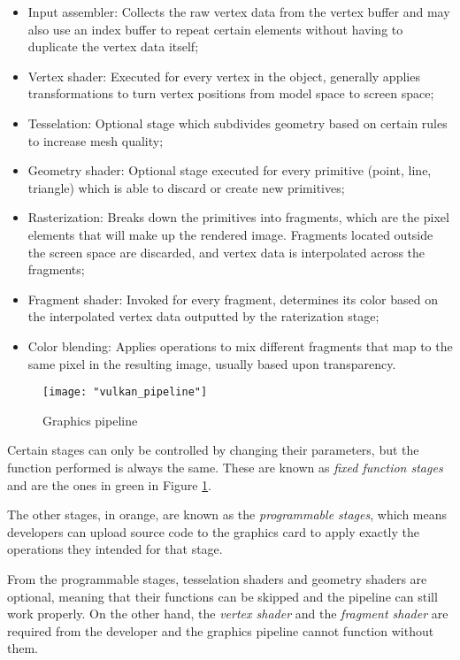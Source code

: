 \begin{itemize}
    \item Input assembler: Collects the raw vertex data from the vertex buffer and may also use an index buffer to repeat certain elements without having to duplicate the vertex data itself;
    \item Vertex shader: Executed for every vertex in the object, generally applies transformations to turn vertex positions from model space to screen space;
    \item Tesselation: Optional stage which subdivides geometry based on certain rules to increase mesh quality;
    \item Geometry shader: Optional stage executed for every primitive (point, line, triangle) which is able to discard or create new primitives;
    \item Rasterization: Breaks down the primitives into fragments, which are the pixel elements that will make up the rendered image. Fragments located outside the screen space are discarded, and vertex data is interpolated across the fragments;
    \item Fragment shader: Invoked for every fragment, determines its color based on the interpolated vertex data outputted by the raterization stage;
    \item Color blending: Applies operations to mix different fragments that map to the same pixel in the resulting image, usually based upon transparency.
\end{itemize}

\begin{figure}[h]
    \caption{Graphics pipeline}
    \begin{center}
        \texttt{[image: "vulkan\_pipeline"]}
    \end{center}
    \label{fig:graphics_pipeline}
\end{figure}

Certain stages can only be controlled by changing their parameters, but the function performed is always the same. These are known as \textit{fixed function stages} and are the ones in green in Figure \ref{fig:graphics_pipeline}.

The other stages, in orange, are known as the \textit{programmable stages}, which means developers can upload source code to the graphics card to apply exactly the operations they intended for that stage.

From the programmable stages, tesselation shaders and geometry shaders are optional, meaning that their functions can be skipped and the pipeline can still work properly. On the other hand, the \textit{vertex shader} and the \textit{fragment shader} are required from the developer and the graphics pipeline cannot function without them.

